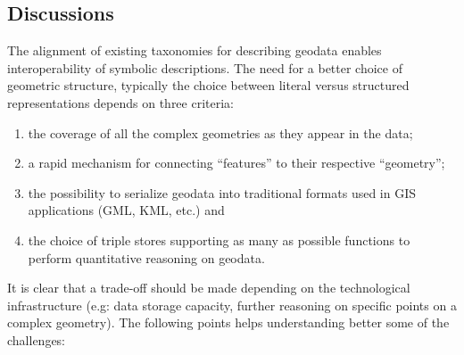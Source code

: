 \subsection{Discussions}
The alignment of existing taxonomies for describing geodata enables interoperability of symbolic descriptions. The need for a better choice of geometric structure, typically the choice between literal versus structured representations depends on three criteria: 
\begin{enumerate}
\item  the coverage of all the complex geometries as they appear in the data;
\item  a rapid mechanism for connecting ``features'' to their respective ``geometry'';
\item the possibility to serialize geodata into traditional formats used in GIS applications (GML, KML, etc.) and
\item the choice of triple stores supporting as many as possible functions to perform quantitative reasoning on geodata.
\end{enumerate}
    
    It is clear that a trade-off should be made depending on the technological infrastructure (e.g: data storage capacity, further reasoning on specific points on a complex geometry). The following points helps understanding better some of the challenges: 

